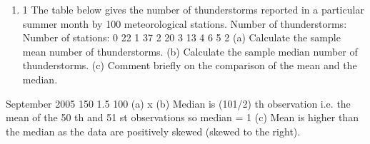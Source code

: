\documentclass[a4paper,12pt]{article}
\begin{document}

\begin{enumerate}
\item 1
The table below gives the number of thunderstorms reported in a particular summer
month by 100 meteorological stations.
Number of thunderstorms:
Number of stations:
0
22
1
37
2
20
3
13
4
6
5
2
(a) Calculate the sample mean number of thunderstorms.
(b) Calculate the sample median number of thunderstorms.
(c) Comment briefly on the comparison of the mean and the median.

\end{enumerate}
September 2005
150
1.5
100
(a) x
(b) Median is (101/2) th observation i.e. the mean of the 50 th and 51 st observations
so median = 1
(c) Mean is higher than the median as the data are positively skewed (skewed to
the right).
\end{document}
